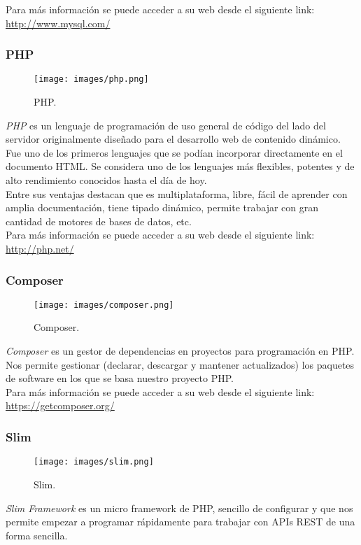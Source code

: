 Para más información se puede acceder a su web desde el siguiente link:\\ \url{http://www.mysql.com/}

\subsubsection*{PHP}
\begin{figure}[H]
	\centering
	\texttt{[image: images/php.png]}
	\caption{PHP.}
\end{figure}
\textit{PHP} es un lenguaje de programación de uso general de código del lado del servidor originalmente diseñado para el desarrollo web de contenido dinámico. Fue uno de los primeros lenguajes que se podían incorporar directamente en el documento HTML. Se considera uno de los lenguajes más flexibles, potentes y de alto rendimiento conocidos hasta el día de hoy.\\

Entre sus ventajas destacan que es multiplataforma, libre, fácil de aprender con amplia documentación, tiene tipado dinámico, permite trabajar con gran cantidad de motores de bases de datos, etc.\\  

Para más información se puede acceder a su web desde el siguiente link:\\ \url{http://php.net/}

\subsubsection*{Composer}
\begin{figure}[H]
	\centering
	\texttt{[image: images/composer.png]}
	\caption{Composer.}
\end{figure}
\textit{Composer} es un gestor de dependencias en proyectos para programación en PHP. Nos permite gestionar (declarar, descargar y mantener actualizados) los paquetes de software en los que se basa nuestro proyecto PHP. \\  

Para más información se puede acceder a su web desde el siguiente link:\\ \url{https://getcomposer.org/}

\subsubsection*{Slim}
\begin{figure}[H]
	\centering
	\texttt{[image: images/slim.png]}
	\caption{Slim.}
\end{figure}
\textit{Slim Framework} es un micro framework de PHP, sencillo de configurar y que nos permite empezar a programar rápidamente para trabajar con APIs REST de una forma sencilla. \\  

